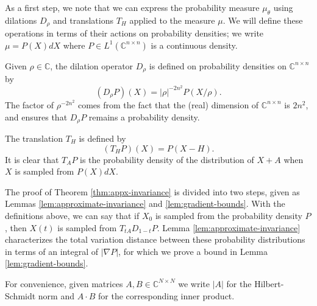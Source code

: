 \documentclass[11pt]{article}
\theoremstyle{plain}
\theoremstyle{plain}
\theoremstyle{plain}
\theoremstyle{plain}
\theoremstyle{plain}
\theoremstyle{plain}
\theoremstyle{plain}
\theoremstyle{remark}
\theoremstyle{remark}
\theoremstyle{plain}
\theoremstyle{plain}
\theoremstyle{plain}
\theoremstyle{plain}
\newcommand{\Complex}{\mathbb C}
\begin{document}
As a first step, we note that we can express the probability measure $\mu_\theta$
using dilations $D_\rho$ and
translations $T_H$ applied to the measure $\mu$.
We will define these operations in terms of their actions on probability densities;
we write $\mu = P(X)dX$ where $P\in L^1(\Complex^{n\times n})$ is a continuous density.

Given $\rho\in\Complex$, the dilation
operator $D_\rho$ is defined on probability densities on $\Complex^{n\times n}$ by
\[
(D_\rho P)(X) = |\rho|^{-2n^2} P(X/\rho).
\]
The factor of $\rho^{-2n^2}$ comes from the fact that the (real) dimension of
$\Complex^{n\times n}$ is $2n^2$, and ensures that $D_\rho P$ remains a probability density.

The translation $T_H$ is defined by
\[
(T_H P)(X) = P(X-H).
\]
It is clear that $T_A P$ is the probability density of the distribution of $X+A$
when $X$ is sampled from $P(X)dX$.


The proof of Theorem \ref{thm:appx-invariance} is divided into two steps, given as Lemmas \ref{lem:approximate-invariance} and \ref{lem:gradient-bounds}. 
With the definitions above, we can say that if $X_0$ is sampled from the probability
density $P$, then $X(t)$ is sampled from $T_{t A}D_{1-t} P$.
Lemma \ref{lem:approximate-invariance} characterizes the total variation distance between these
probability distributions in terms of an integral of $|\nabla P|$, for which we prove a bound in Lemma \ref{lem:gradient-bounds}.

For convenience, given matrices $A,B\in\Complex^{N\times N}$
we write $|A|$ for the Hilbert-Schmidt norm 
and $A\cdot B$ for the corresponding inner product.
\end{document}
